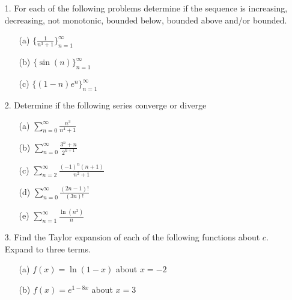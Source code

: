 \documentclass[12pt, amssymb, one column]{article}
\begin{document}
\begin{itemize}
	\item[1.] For each of the following problems determine if the sequence is increasing, decreasing, not monotonic, bounded below, bounded above and/or bounded.
		\begin{itemize}
			\item[(a)] $\{\frac{1}{n^3+1}\}_{n=1}^\infty$
			\item[(b)] $\{\sin(n)\}_{n=1}^\infty$
			\item[(c)] $\{(1-n)e^n\}_{n=1}^\infty$
		\end{itemize}
	
	\item[2.] Determine if the following series converge or diverge
		\begin{itemize}
			\item[(a)]$\sum_{n=0}^\infty \frac{n^3}{n^4+1}$
			\item[(b)]$\sum_{n=0}^\infty \frac{3^n+n}{2^{n+1}}$
			\item[(c)]$\sum_{n=2}^\infty \frac{(-1)^n(n+1)}{n^2+1}$
			\item[(d)]$\sum_{n=0}^{\infty} \frac{(2n-1)!}{(3n)!}$
			\item[(e)]$\sum_{n=1}^\infty \frac{\ln (n^2)}{n}$
		\end{itemize}
	
	\item[3.] Find the Taylor expansion of each of the following functions about $c$. Expand to three terms.
		\begin{itemize}
			\item[(a)] $f(x) = \ln (1-x)$ about $x=-2$
			\item[(b)] $f(x) = e^{1-8x}$ about $x=3$
		\end{itemize}
			
\end{itemize}
\end{document}
